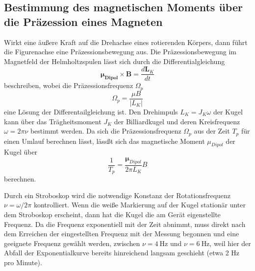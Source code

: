 \subsection{Bestimmung des magnetischen Moments über die Präzession eines Magneten}
\label{sec:Präzession}
Wirkt eine äußere Kraft auf die Drehachse eines rotierenden Körpers, dann führt die Figurenachse eine Präzessionsbewegung aus.
Die Präzessionsbewegung im Magnetfeld der Helmholtzspulen lässt sich durch die Differentialgleichung
\begin{equation}
    \symbf{\mu_{Dipol}} \times \symbf{B} = \frac{d\symbf{L}_K}{dt}
\end{equation}
beschreiben, wobei die Präzessionsfrequenz $\Omega_p$
\begin{equation}
    \Omega_p = \frac{\mu B}{|L_K|}
\end{equation}
eine Lösung der Differentailgleichung ist.
Den Drehimpuls $L_K = J_K \omega$ der Kugel kann über das Trägheitsmoment $J_K$ der Billiardkugel und deren Kreisfrequenz $\omega = 2\pi \nu$ bestimmt werden.
Da sich die Präzessionsfrequenz $\Omega_p$ aus der Zeit $T_p$ für einen Umlauf berechnen lässt, lässßt sich das magnetische Moment $\mu_{Dipol}$ der Kugel über
\begin{equation}
    \frac{1}{T_p} = \frac{\symbf{\mu}_{Dipol}}{2 \pi L_K} B
    \label{eqn:praezession}
\end{equation}
berechnen.

Durch ein Stroboskop wird die notwendige Konstanz der Rotationsfrequenz $\nu = \omega / 2 \pi$ kontrolliert.
Wenn die weiße Markierung auf der Kugel stationär unter dem Stroboskop erscheint, dann hat die Kugel die am Gerät eigenstellte Frequenz.
Da die Frequenz exponentiell mit der Zeit abnimmt, muss direkt nach dem Erreichen der eingestellten Frequenz mit der Messung begonnen und
eine geeignete Frequenz gewählt werden, zwischen $\nu = \SI{4}{\Hz}$ und $\nu = \SI{6}{\Hz}$, weil hier der Abfall der Exponentialkurve bereits hinreichend langsam geschieht (etwa 2 Hz pro Minute).\cite{sample}
